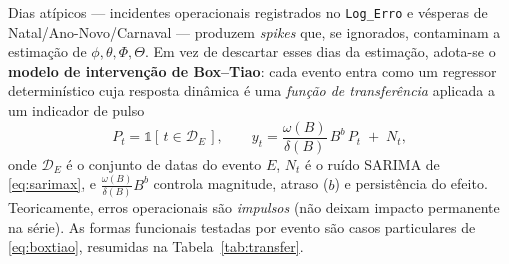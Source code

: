 \documentclass[11pt,a4paper]{article}
\begin{document}
Dias atípicos --- incidentes operacionais registrados no \texttt{Log\_Erro} e vésperas de
Natal/Ano-Novo/Carnaval --- produzem \emph{spikes} que, se ignorados, contaminam a estimação de
$\phi,\theta,\Phi,\Theta$. Em vez de descartar esses dias da estimação, adota-se o \textbf{modelo
de intervenção de Box--Tiao}: cada evento entra como um regressor determinístico cuja resposta
dinâmica é uma \emph{função de transferência} aplicada a um indicador de pulso
\begin{equation}
P_t = \mathbb{1}[\,t \in \mathcal{D}_E\,],
\qquad
y_t = \frac{\omega(B)}{\delta(B)}\,B^{b}\,P_t \;+\; N_t,
\label{eq:boxtiao}
\end{equation}
onde $\mathcal{D}_E$ é o conjunto de datas do evento $E$, $N_t$ é o ruído SARIMA de
\eqref{eq:sarimax}, e $\tfrac{\omega(B)}{\delta(B)}B^{b}$ controla magnitude, atraso ($b$) e
persistência do efeito. Teoricamente, erros operacionais são \emph{impulsos} (não deixam impacto
permanente na série). As formas funcionais testadas por evento são casos particulares de
\eqref{eq:boxtiao}, resumidas na Tabela~\ref{tab:transfer}.
\end{document}
